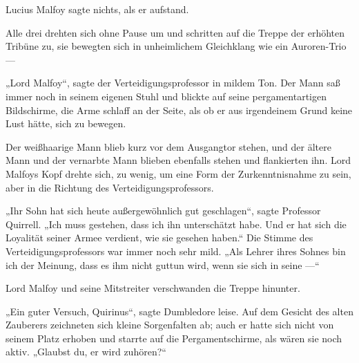 Lucius Malfoy sagte nichts, als er aufstand.

Alle drei drehten sich ohne Pause um und schritten auf die Treppe der erhöhten Tribüne zu, sie bewegten sich in unheimlichem Gleichklang wie ein Auroren-Trio —

„Lord Malfoy“, sagte der Verteidigungsprofessor in mildem Ton. Der Mann saß immer noch in seinem eigenen Stuhl und blickte auf seine pergamentartigen Bildschirme, die Arme schlaff an der Seite, als ob er aus irgendeinem Grund keine Lust hätte, sich zu bewegen.

Der weißhaarige Mann blieb kurz vor dem Ausgangtor stehen, und der ältere Mann und der vernarbte Mann blieben ebenfalls stehen und flankierten ihn. Lord Malfoys Kopf drehte sich, zu wenig, um eine Form der Zurkenntnisnahme zu sein, aber in die Richtung des Verteidigungsprofessors.

„Ihr Sohn hat sich heute außergewöhnlich gut geschlagen“, sagte Professor Quirrell.
„Ich muss gestehen, dass ich ihn unterschätzt habe. Und er hat sich die Loyalität seiner Armee verdient, wie sie gesehen haben.“ Die Stimme des Verteidigungsprofessors war immer noch sehr mild.
„Als Lehrer ihres Sohnes bin ich der Meinung, dass es ihm nicht guttun wird, wenn sie sich in seine —“

Lord Malfoy und seine Mitstreiter verschwanden die Treppe hinunter.

„Ein guter Versuch, Quirinus“, sagte Dumbledore leise. Auf dem Gesicht des alten Zauberers zeichneten sich kleine Sorgenfalten ab; auch er hatte sich nicht von seinem Platz erhoben und starrte auf die Pergamentschirme, als wären sie noch aktiv.
„Glaubst du, er wird zuhören?“

